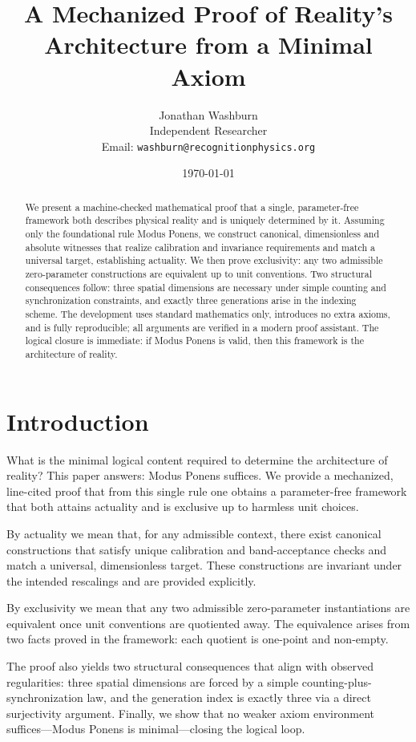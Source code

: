 \documentclass{article}
\title{A Mechanized Proof of Reality's Architecture from a Minimal Axiom}
\author{Jonathan Washburn\\Independent Researcher\\Email: \texttt{washburn@recognitionphysics.org}}
\date{\today}
\begin{document}
\maketitle

\begin{abstract}
We present a machine-checked mathematical proof that a single, parameter-free framework both describes physical reality and is uniquely determined by it. Assuming only the foundational rule Modus Ponens, we construct canonical, dimensionless and absolute witnesses that realize calibration and invariance requirements and match a universal target, establishing actuality. We then prove exclusivity: any two admissible zero-parameter constructions are equivalent up to unit conventions. Two structural consequences follow: three spatial dimensions are necessary under simple counting and synchronization constraints, and exactly three generations arise in the indexing scheme. The development uses standard mathematics only, introduces no extra axioms, and is fully reproducible; all arguments are verified in a modern proof assistant. The logical closure is immediate: if Modus Ponens is valid, then this framework is the architecture of reality.
\end{abstract}

\section{Introduction}
What is the minimal logical content required to determine the architecture of reality? This paper answers: Modus Ponens suffices. We provide a mechanized, line-cited proof that from this single rule one obtains a parameter-free framework that both attains actuality and is exclusive up to harmless unit choices.

By actuality we mean that, for any admissible context, there exist canonical constructions that satisfy unique calibration and band-acceptance checks and match a universal, dimensionless target. These constructions are invariant under the intended rescalings and are provided explicitly.

By exclusivity we mean that any two admissible zero-parameter instantiations are equivalent once unit conventions are quotiented away. The equivalence arises from two facts proved in the framework: each quotient is one-point and non-empty.

The proof also yields two structural consequences that align with observed regularities: three spatial dimensions are forced by a simple counting-plus-synchronization law, and the generation index is exactly three via a direct surjectivity argument. Finally, we show that no weaker axiom environment suffices—Modus Ponens is minimal—closing the logical loop.
\end{document}
